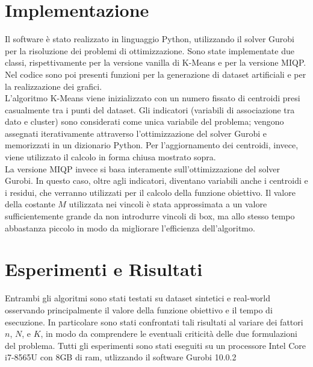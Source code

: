 \documentclass{article}
\begin{document}
    \section{Implementazione}
    Il software è stato realizzato in linguaggio Python, utilizzando il solver Gurobi per la risoluzione dei problemi di ottimizzazione. Sono state implementate due classi, rispettivamente per la versione vanilla di K-Means e per la versione MIQP. Nel codice sono poi presenti funzioni per la generazione di dataset artificiali e per la realizzazione dei grafici.\\
    L'algoritmo K-Means viene inizializzato con un numero fissato di centroidi presi casualmente tra i punti del dataset. Gli indicatori (variabili di associazione tra dato e cluster) sono considerati come unica variabile del problema; vengono assegnati iterativamente attraverso l'ottimizzazione del solver Gurobi e memorizzati in un dizionario Python. Per l'aggiornamento dei centroidi, invece, viene utilizzato il calcolo in forma chiusa mostrato sopra.\\
    La versione MIQP invece si basa interamente sull'ottimizzazione del solver Gurobi. In questo caso, oltre agli indicatori, diventano variabili anche i centroidi e i residui, che verranno utilizzati per il calcolo della funzione obiettivo. Il valore della costante $M$ utilizzata nei vincoli è stata approssimata a un valore sufficientemente grande da non introdurre vincoli di box, ma allo stesso tempo abbastanza piccolo in modo da migliorare l'efficienza dell'algoritmo.\\

    \section{Esperimenti e Risultati}
    Entrambi gli algoritmi sono stati testati su dataset sintetici e real-world osservando principalmente il valore della funzione obiettivo e il tempo di esecuzione. In particolare sono stati confrontati tali risultati al variare dei fattori $n$, $N$, e $K$, in modo da comprendere le eventuali criticità delle due formulazioni del problema. Tutti gli esperimenti sono stati eseguiti su un processore Intel Core i7-8565U con 8GB di ram, utlizzando il software Gurobi 10.0.2\\
\end{document}
